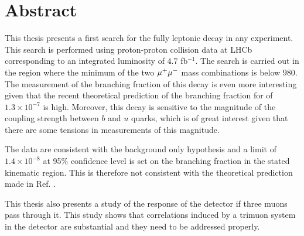 \chapter*{Abstract}
\noindent
This thesis presents a first search for the fully leptonic decay \Bmumumu in any experiment. This search is performed using
proton-proton collision data at LHCb corresponding to an integrated luminosity of $4.7$ fb$^{-1}$. The search is carried out in the
region where the minimum of the two ${\mu^+\mu^-}$ mass combinations is below $980$\mevcc. The measurement of the branching fraction of this decay is even more interesting given that the recent theoretical prediction \cite{Danilina:2018uzr} of the branching fraction for \Bmumumu of $1.3 \times 10^{-7}$ is high. Moreover, this decay is sensitive to the magnitude of the coupling strength between $b$ and $u$ quarks, which is of great interest given that there are some tensions in measurements of this magnitude.

The data are consistent with the background only hypothesis and a limit of $1.4 \times 10^{-8}$ at 95\% confidence level is set on the branching fraction in the stated kinematic region. This is therefore not consistent with the theoretical prediction made in Ref. \cite{Danilina:2018uzr}.

This thesis also presents a study of the response of the detector if three muons pass through it. This study shows that correlations induced by a trimuon system in the detector are substantial and they need to be addressed properly.



